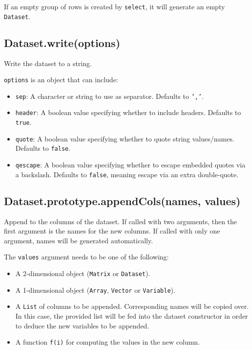 \documentclass{article}
\begin{document}
If an empty group of rows is created by \texttt{select}, it will generate an empty \texttt{Dataset}.


    \subsection*{Dataset.write(options)}
    Write the dataset to a string.


\texttt{options} is an object that can include:


\begin{itemize}

\item \texttt{sep}: A character or string to use as separator. Defaults to \texttt{','}.

\item \texttt{header}: A boolean value specifying whether to include headers. Defaults to \texttt{true}.

\item \texttt{quote}: A boolean value specifying whether to quote string values/names. Defaults
 to \texttt{false}.

\item \texttt{qescape}: A boolean value specifying whether to escape embedded quotes via a
 backslash. Defaults to \texttt{false}, meaning escape via an extra double-quote.

\end{itemize}

    \subsection*{Dataset.prototype.appendCols(names, values)}
    Append to the columns of the dataset.
If called with two arguments, then the first argument is the names for the
new columns. If called with only one argument, names will be generated
automatically.


The \texttt{values} argument needs to be one of the following:


\begin{itemize}

\item A 2-dimensional object (\texttt{Matrix} or \texttt{Dataset}).

\item A 1-dimensional object (\texttt{Array}, \texttt{Vector} or \texttt{Variable}).

\item A \texttt{List} of columns to be appended. Corresponding names will be copied over.
In this case, the provided list will be fed into the dataset constructor in
order to deduce the new variables to be appended.

\item A function \texttt{f(i)} for computing the values in the new column.

\end{itemize}
\end{document}
